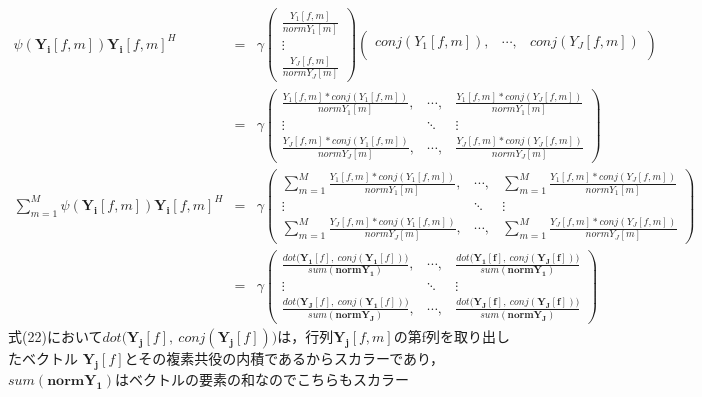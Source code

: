 \documentclass[a4j]{jarticle}
\begin{document}
\begin{eqnarray}
 \psi (\bm{Y_i}[f,m])\bm{Y_i}[f,m]^H &=& 
\gamma \left(
\begin{array}{c}
 \frac{Y_1[f,m]}{normY_1[m]}\\
 \vdots \\
 \frac{Y_J[f,m]}{normY_J[m]}
\end{array}
\right)
\left(
 \begin{array}{ccc}
  conj(Y_1[f,m]),&\cdots, & conj(Y_J[f,m])\\
 \end{array}
\right)  \nonumber \\
&=& \gamma
\left(
\begin{array}{ccc}
 \frac{Y_1[f,m] * conj(Y_1[f,m])}{normY_1[m]}, & \cdots, & \frac{Y_1[f,m] * conj(Y_J[f,m])}{normY_1[m]}\\
 \vdots & \ddots & \vdots \\
 \frac{Y_J[f,m] * conj(Y_1[f,m])}{normY_J[m]}, & \cdots, & \frac{Y_J[f,m] * conj(Y_J[f,m])}{normY_J[m]}
\end{array}
\right) \nonumber \\
\sum_{m=1}^{M} \psi (\bm{Y_i}[f,m])\bm{Y_i}[f,m]^H &=& \gamma
\left(
\begin{array}{ccc}
 \sum_{m=1}^{M}\frac{Y_1[f,m] * conj(Y_1[f,m])}{normY_1[m]}, & \cdots, & \sum_{m=1}^{M}\frac{Y_1[f,m] * conj(Y_J[f,m])}{normY_1[m]}\\
 \vdots & \ddots & \vdots \\
 \sum_{m=1}^{M}\frac{Y_J[f,m] * conj(Y_1[f,m])}{normY_J[m]}, & \cdots, & \sum_{m=1}^{M}\frac{Y_J[f,m] * conj(Y_J[f,m])}{normY_J[m]}
\end{array}
\right) \nonumber \\
&=& \gamma
\left(
\begin{array}{ccc}
 \frac{dot\bigl(\bm{Y_1}[f],\ conj(\bm{Y_1}[f])\bigr)}{sum(\bm{normY_1})}, & \cdots, & \frac{dot\bigl(\bm{Y_1[f]},\ conj(\bm{Y_J[f]})\bigr)}{sum(\bm{normY_1})}\\
 \vdots & \ddots & \vdots \\
 \frac{dot\bigl(\bm{Y_J}[f],\ conj(\bm{Y_1}[f])\bigr)}{sum(\bm{normY_J})}, & \cdots, & \frac{dot\bigl(\bm{Y_J[f]},\ conj(\bm{Y_J[f]})\bigr)}{sum(\bm{normY_J})}
\end{array}
\right) 
\end{eqnarray}
式(22)において$dot\bigl(\bm{Y_j}[f],\ conj(\bm{Y_j}[f])\bigr)$は，行列$\bm{Y_j}[f,m]$の第f列を取り出したベクトル
$\bm{Y_j}[f]$とその複素共役の内積であるからスカラーであり，$sum(\bm{normY_1})$はベクトルの要素の和なのでこちらもスカラー
\end{document}
